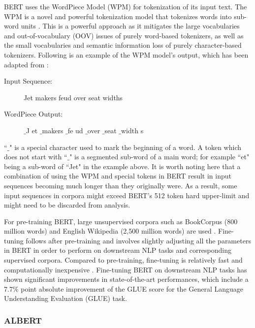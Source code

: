 \begin{description}[style=nextline]
\item [WordPiece Tokenization] BERT uses the WordPiece Model (WPM) for tokenization of its input text. The WPM is a novel and powerful tokenization model that tokenizes words into sub-word units \citep{wu2016google}. This is a powerful approach as it mitigates the large vocabularies and out-of-vocabulary (OOV) issues of purely word-based tokenizers, as well as the small vocabularies and semantic information loss of purely character-based tokenizers. Following is an example of the WPM model's output, which has been adapted from \citet{wu2016google}:

\begin{description}
    \item [Input Sequence:] Jet makers feud over seat widths
    \item [WordPiece Output:] $\_$J et $\_$makers $\_$fe ud $\_$over $\_$seat $\_$width s
\end{description}

``$\_$" is a special character used to mark the beginning of a word. A token which does not start with ``$\_$" is a segmented sub-word of a main word; for example ``et" being a sub-word of ``Jet" in the example above. It is worth noting here that a combination of using the WPM and special tokens in BERT result in input sequences becoming much longer than they originally were. As a result, some input sequences in corpora might exceed BERT's 512 token hard upper-limit and might need to be discarded from analysis.

\item [Fine-tuning] For pre-training BERT, large unsupervised corpora such as BookCorpus (800 million words) and English Wikipedia (2,500 million words) are used \citep{devlin2018bert}. Fine-tuning follows after pre-training and involves slightly adjusting all the parameters in BERT in order to perform on downstream NLP tasks and corresponding supervised corpora. Compared to pre-training, fine-tuning is relatively fast and computationally inexpensive \citep{devlin2018bert}. Fine-tuning BERT on downstream NLP tasks has shown significant improvements in state-of-the-art performances, which include a 7.7$\%$ point absolute improvement of the GLUE score for the General Language Understanding Evaluation (GLUE) task.
\end{description}

\subsubsection{ALBERT}
\label{albert}

